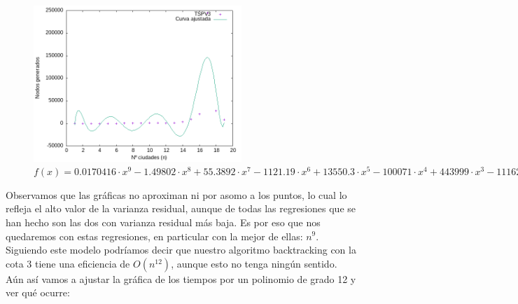 \documentclass{article}
\begin{document}


\begin{figure}[H]
    \centering
    \includegraphics[width=0.7\textwidth]{imagenes/cota3/CurvaAjustada_n9_bk.png}
    \caption*{$f(x)=0.0170416 \cdot x^9 - 1.49802 \cdot x^8 + 55.3892 \cdot x^7 -1121.19  \cdot x^6 + 13550.3 \cdot x^5 -100071 \cdot x^4 + 443999 \cdot x^3 -1116220 \cdot x^2 + 1401350 \cdot x -644323$}
\end{figure}




Observamos que las gráficas no aproximan ni por asomo a los puntos, lo cual lo refleja el alto valor de la varianza residual, aunque de todas las regresiones que se han hecho son las dos con varianza residual más baja. Es por eso que nos quedaremos con estas regresiones, en particular con la mejor de ellas: $n^9$. Siguiendo este modelo podríamos decir que nuestro algoritmo backtracking con la cota 3 tiene una eficiencia de $O(n^{12})$, aunque esto no tenga ningún sentido. \\

Aún así vamos a ajustar la gráfica de los tiempos por un polinomio de grado 12 y ver qué ocurre:


\end{document}
